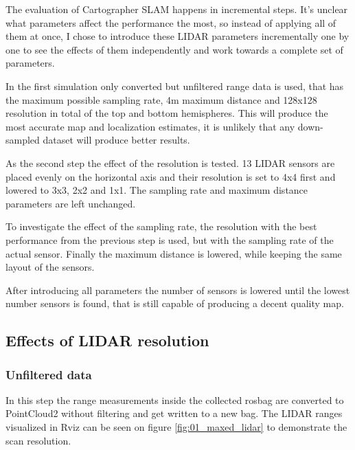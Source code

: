 The evaluation of Cartographer SLAM happens in incremental steps. It's unclear what parameters
affect the performance the most, so instead of applying all of them at once, I chose to introduce
these LIDAR parameters incrementally one by one to see the effects of them independently 
and work towards a complete set of parameters. 

In the first simulation only converted but unfiltered range data is used, that has the 
maximum possible sampling rate, 4m maximum distance and 128x128 resolution in total of 
the top and bottom hemispheres. This will produce the most accurate map and localization 
estimates, it is unlikely that any down-sampled dataset will produce better results.

As the second step the effect of the resolution is tested. 13 LIDAR sensors are placed
evenly on the horizontal axis and their resolution is set to 4x4 first and lowered to 3x3,
2x2 and 1x1. The sampling rate and maximum distance parameters are left unchanged.

To investigate the effect of the sampling rate, the resolution with the best performance 
from the previous step is used, but with the sampling rate of the actual sensor. Finally
the maximum distance is lowered, while keeping the same layout of the sensors.

After introducing all parameters the number of sensors is lowered until the lowest number 
sensors is found, that is still capable of producing a decent quality map.







\newpage



\subsection{Effects of LIDAR resolution}
\subsubsection{Unfiltered data}
In this step the range measurements inside the collected rosbag are converted to PointCloud2 
without filtering and get written to a new bag. The LIDAR ranges visualized in 
Rviz can be seen on figure \ref{fig:01_maxed_lidar} to demonstrate the scan resolution. 

